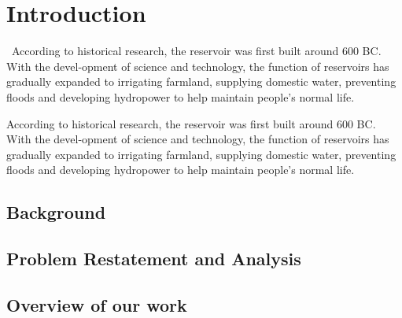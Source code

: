 \section{Introduction}  %
\
\indent According to historical research, the reservoir was first built around 600 BC. With the devel-opment of science and technology, the function of reservoirs has gradually expanded to irrigating farmland, supplying domestic water, preventing floods and developing hydropower to help maintain people’s normal life.

According to historical research, the reservoir was first built around 600 BC. With the devel-opment of science and technology, the function of reservoirs has gradually expanded to irrigating farmland, supplying domestic water, preventing floods and developing hydropower to help maintain people’s normal life.

\subsection{Background}
\subsection{Problem Restatement and Analysis}
\subsection{Overview of our work}
